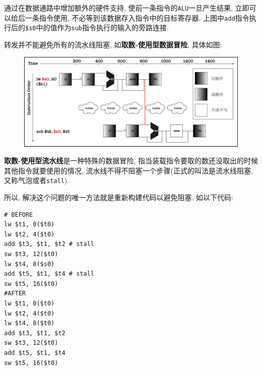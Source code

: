 通过在数据通路中增加额外的硬件支持, 使前一条指令的\verb|ALU|一旦产生结果, 立即可以给后一条指令使用, 不必等到该数据存入指令中的目标寄存器. 上图中\verb|add|指令执行后的\verb|$s0|中的值作为\verb|sub|指令执行的输入的旁路连接.\par
转发并不能避免所有的流水线阻塞, 如{\heiti \textbf{取数-使用型数据冒险}}, 具体如图:
\begin{figure}[H]
\centering
\includegraphics[scale=.4]{img/figure44.pdf}
\end{figure}\par
{\heiti \textbf{取数-使用型流水线}}是一种特殊的数据冒险, 指当装载指令要取的数还没取出的时候其他指令就要使用的情况, 流水线不得不阻塞一个步骤(正式的叫法是流水线阻塞, 又称气泡或者\verb|stall|).\par
所以, 解决这个问题的唯一方法就是重新构建代码以避免阻塞. 如以下代码:
\begin{lstlisting}
# BEFORE
lw $t1, 0($t0)
lw $t2, 4($t0)
add $t3, $t1, $t2 # stall
sw $t3, 12($t0)
lw $t4, 8($s0)
add $t5, $t1, $t4 # stall
sw $t5, 16($t0)
#AFTER
lw $t1, 0($t0)
lw $t2, 4($t0)
lw $t4, 8($t0)
add $t3, $t1, $t2
sw $t3, 12($t0)
add $t5, $t1, $t4
sw $t5, 16($t0)
\end{lstlisting}

